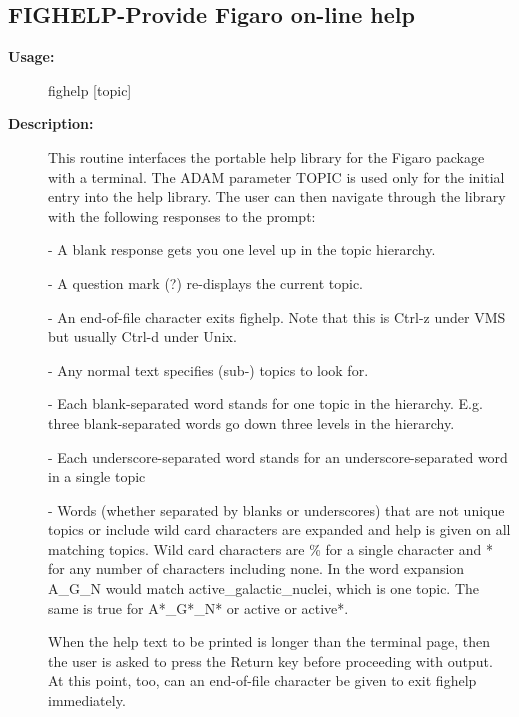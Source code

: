 \subsection{FIGHELP-\label{FIGHELP}Provide Figaro on-line help}
\begin{description}

\item [{\bf Usage:}]
 fighelp [topic]

\item [{\bf Description:}]
 This routine interfaces the portable help library for the Figaro
 package with a terminal. The ADAM parameter TOPIC is used only for
 the initial entry into the help library. The user can then
 navigate through the library with the following responses to the
 prompt:

   -  A blank response gets you one level up in the topic hierarchy.

   -  A question mark (?) re-displays the current topic.

   -  An end-of-file character exits fighelp. Note that this is
      Ctrl-z under VMS but usually Ctrl-d under Unix.

   -  Any normal text specifies (sub-) topics to look for.

   -  Each blank-separated word stands for one topic in the
      hierarchy. E.g. three blank-separated words go down three
      levels in the hierarchy.

   -  Each underscore-separated word stands for an
      underscore-separated word in a single topic

   -  Words (whether separated by blanks or underscores) that are not
      unique topics or include wild card characters are expanded and
      help is given on all matching topics. Wild card characters are
      \% for a single character and * for any number of characters
      including none. In the word expansion A_G_N would match
      active_galactic_nuclei, which is one topic. The same is true
      for A*_G*_N* or active or active*.

 When the help text to be printed is longer than the terminal page,
 then the user is asked to press the Return key before proceeding
 with output. At this point, too, can an end-of-file character be
 given to exit fighelp immediately.


\end{description}
